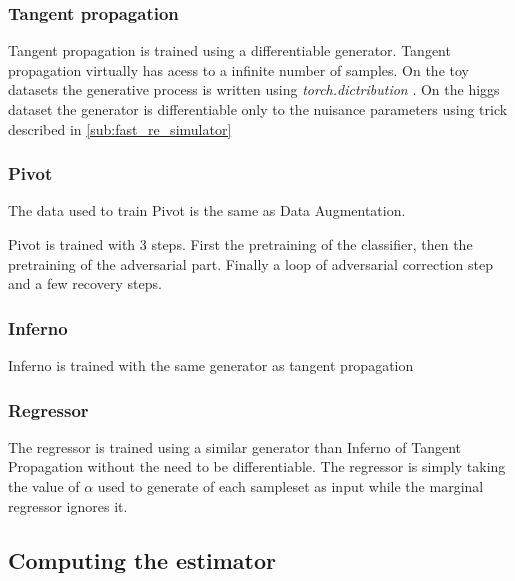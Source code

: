 \subsubsection{Tangent propagation} %
\label{ssub:tangent_propagation}

Tangent propagation is trained using a differentiable generator.
Tangent propagation virtually has acess to a infinite number of samples.
On the toy datasets the generative process is written using \emph{torch.dictribution} .
On the higgs dataset the generator is differentiable only to the nuisance parameters using trick described in \autoref{sub:fast_re_simulator} 




\subsubsection{Pivot} %
\label{ssub:pivot}


The data used to train Pivot is the same as Data Augmentation.

Pivot is trained with 3 steps.
First the pretraining of the classifier, then the pretraining of the adversarial part.
Finally a loop of adversarial correction step and a few recovery steps.




\subsubsection{Inferno} %
\label{ssub:inferno}

Inferno is trained with the same generator as tangent propagation




\subsubsection{Regressor} %
\label{ssub:regressor}

The regressor is trained using a similar generator than Inferno of Tangent Propagation without the need to be differentiable.
The regressor is simply taking the value of $\alpha$ used to generate of each sampleset as input while the marginal regressor ignores it.






\subsection{Computing the estimator} %
\label{sub:computing_the_estimator}







